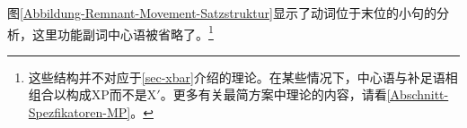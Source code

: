 图\vref{Abbildung-Remnant-Movement-Satzstruktur}显示了动词位于末位的小句的分析，这里功能副词中心语被省略了。\footnote{%
这些结构并不对应于\ref{sec-xbar}介绍的\xbarc 理论。在某些情况下，中心语与补足语相组合以构成XP而不是X$'$。更多有关最简方案中\xbarc 理论的内容，请看\ref{Abschnitt-Spezfikatoren-MP}。
}
